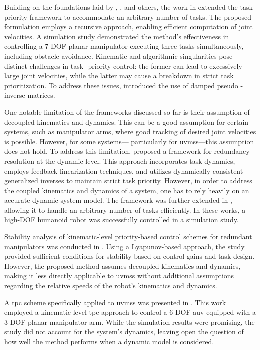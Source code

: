 Building on the foundations laid by \cite{hanafusa1981}, \cite{nakamura1987}, 
and others, the work in \cite{siciliano1991} extended the task-priority 
framework to accommodate an arbitrary number of tasks. The proposed formulation 
employs a recursive approach, enabling efficient computation of joint 
velocities. A simulation study demonstrated the method's effectiveness in 
controlling a 7-DOF planar manipulator executing three tasks simultaneously, including 
obstacle avoidance.
Kinematic and algorithmic singularities pose distinct challenges in task-
priority control: the former can lead to excessively large joint velocities, 
while the latter may cause a breakdown in strict task prioritization. To 
address these issues, \cite{chiaverini1997} introduced the use of damped pseudo
-inverse matrices.

One notable limitation of the frameworks discussed so far is their assumption 
of decoupled kinematics and dynamics. This can be a good assumption for certain systems,
such as manipulator arms, where good tracking of desired joint velocities is possible.
However, for some systems—
particularly for \gls{uvms}s—this 
assumption does not hold. To address this limitation, \cite{khatib1987} 
proposed a framework for redundancy resolution at the dynamic level. This 
approach incorporates task dynamics, employs feedback linearization techniques, 
and utilizes dynamically consistent generalized inverses \cite{khatib1995} to 
maintain strict task priority.
However, in order to address the coupled kinematics and dynamics of a system, one has to rely heavily on an accurate
dynamic system model.
The framework was further extended in \cite{khatib2004,sentis2004}, 
allowing it to handle an arbitrary number of tasks efficiently. In these works, a 
high-DOF humanoid robot was successfully controlled in a simulation study.

Stability analysis of kinematic-level priority-based control schemes for 
redundant manipulators was conducted in \cite{antonelli2009}. Using a 
Lyapunov-based approach, the study provided sufficient conditions for stability 
based on control gains and task design. However, the proposed method assumes 
decoupled kinematics and dynamics, making it less directly applicable to \gls{uvms}s 
without additional assumptions regarding the relative speeds of
the robot's kinematics and dynamics.

A \gls{tpc} scheme specifically applied to \gls{uvms}s was presented in 
\cite{antonelli1998}. This work employed a kinematic-level \gls{tpc}
approach to control a 6-DOF \gls{auv} 
equipped with a 3-DOF planar manipulator arm. While the simulation results were 
promising, the study did not account for the system's dynamics, leaving open the question
of how well the method performs when a dynamic model is considered.

